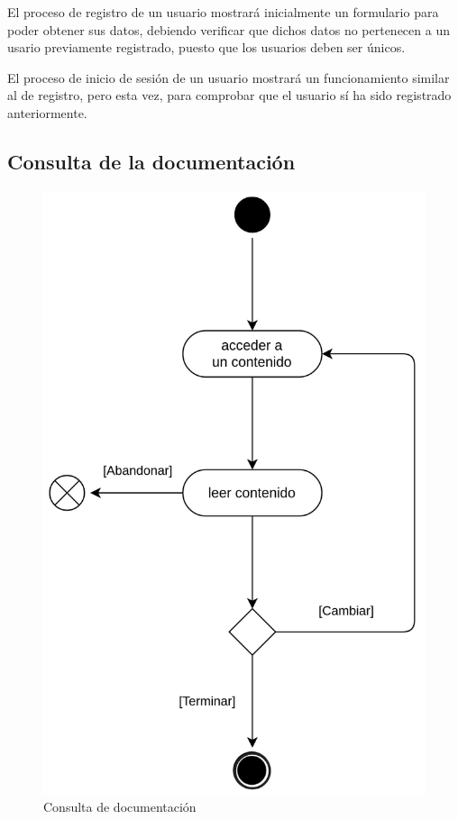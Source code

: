             El proceso de registro de un usuario mostrará inicialmente un formulario para poder obtener sus datos, debiendo verificar que dichos datos no pertenecen a un usario previamente registrado, puesto que los usuarios deben ser únicos.
            
            El proceso de inicio de sesión de un usuario mostrará un funcionamiento similar al de registro, pero esta vez, para comprobar que el usuario sí ha sido registrado anteriormente.
            
            \newpage
            
            
        \subsection{Consulta de la documentación}
            \label{sec:consulta-documentacion}
            
            \begin{figure}[h]
                \centering
                \includegraphics[scale=0.20]{images/Diagramas/Actividades y transiciones 3.png}
                \caption{Consulta de documentación}
                \label{fig:consulta-documentacion}
            \end{figure}
            
